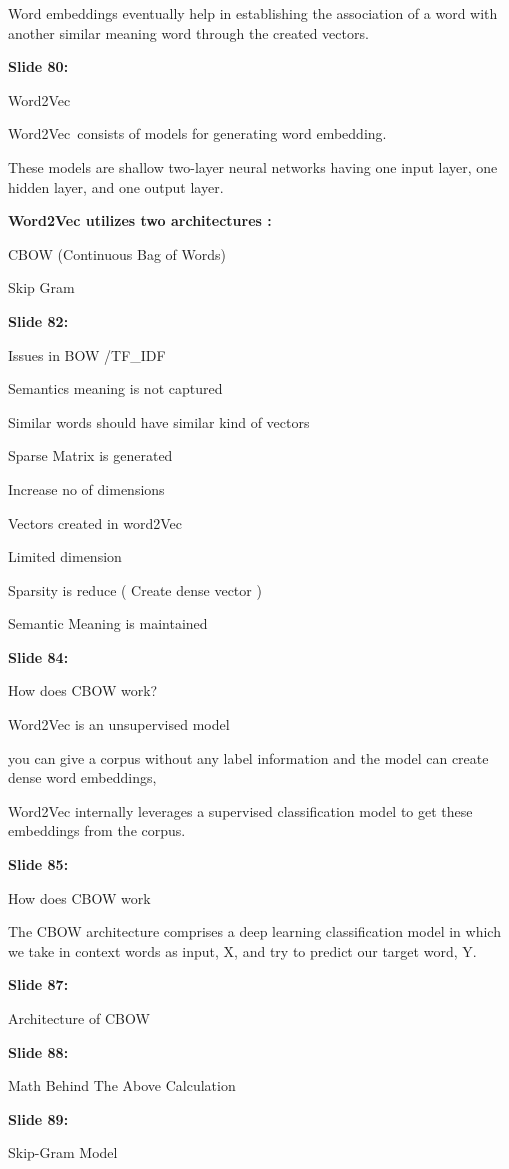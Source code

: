 \documentclass[11pt,a4paper]{article}
\begin{document}
Word embeddings eventually help in establishing the association of a word with another similar meaning word through the created vectors.

\textbf{Slide 80:}

Word2Vec

Word2Vec consists of models for generating word embedding.

These models are shallow two-layer neural networks having one input layer, one hidden layer, and one output layer.

\textbf{Word2Vec utilizes two architectures :} 

CBOW (Continuous Bag of Words)

Skip Gram

\textbf{Slide 82:}

Issues in BOW /TF\_IDF

Semantics meaning is not captured

Similar words should have similar kind of vectors

Sparse Matrix is generated

Increase no of dimensions

Vectors created in word2Vec

Limited dimension

Sparsity is reduce ( Create dense vector )

Semantic Meaning is maintained

\textbf{Slide 84:}

How does CBOW work?

Word2Vec is an unsupervised model

you can give a corpus without any label information and the model can create dense word embeddings,

Word2Vec internally leverages a supervised classification model to get these embeddings from the corpus.

\textbf{Slide 85:}

How does CBOW work

The CBOW architecture comprises a deep learning classification model in which we take in context words as input, X, and try to predict our target word, Y.

\textbf{Slide 87:}

Architecture of CBOW

\textbf{Slide 88:}

Math Behind The Above Calculation

\textbf{Slide 89:}

Skip-Gram Model
\end{document}
